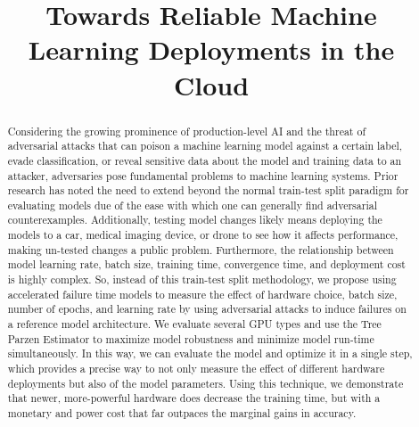 \documentclass[conference]{IEEEtran}
\begin{document}
\title{Towards Reliable Machine Learning Deployments in the Cloud}
\author{
\and
{}
\and
{}
\and
{}
}

\maketitle

\begin{abstract}
Considering the growing prominence of production-level AI and the threat of adversarial attacks that can poison a machine learning model against a certain label, evade classification, or reveal sensitive data about the model and training data to an attacker, adversaries pose fundamental problems to machine learning systems. Prior research has noted the need to extend beyond the normal train-test split paradigm for evaluating models due of the ease with which one can generally find adversarial counterexamples. Additionally, testing model changes likely means deploying the models to a car, medical imaging device, or drone to see how it affects performance, making un-tested changes a public problem. Furthermore, the relationship between model learning rate, batch size, training time, convergence time, and deployment cost is highly complex. So, instead of this train-test split methodology, we propose using accelerated failure time models to measure the effect of hardware choice, batch size, number of epochs, and learning rate by using adversarial attacks to induce failures on a reference model architecture. We evaluate several GPU types and use the Tree Parzen Estimator to maximize model robustness and minimize model run-time simultaneously. In this way, we can evaluate the model and optimize it in a single step, which provides a precise way to not only measure the effect of different hardware deployments but also of the model parameters. Using this technique, we demonstrate that newer, more-powerful hardware does decrease the training time, but with a monetary and power cost that far outpaces the marginal gains in accuracy.
\end{abstract}
\end{document}
